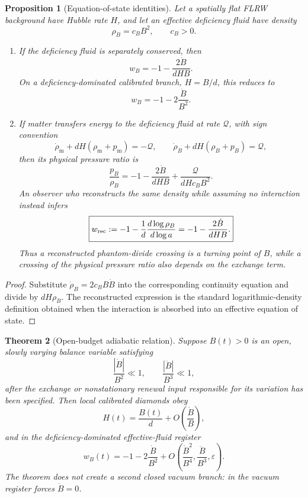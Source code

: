 \documentclass[11pt]{article}
\newtheorem{theorem}{Theorem}[section]
\newtheorem{proposition}[theorem]{Proposition}
\theoremstyle{definition}
\theoremstyle{remark}
\newcommand{\eps}{\varepsilon}
\begin{document}
\begin{proposition}[Equation-of-state identities]
\label{prop:deficiency-eos-identities}
Let a spatially flat FLRW background have Hubble rate \(H\), and let an effective
deficiency fluid have density
\[
  \rho_B=c_BB^2,
  \qquad c_B>0.
\]
\begin{enumerate}[label=\textup{(\roman*)},leftmargin=2.6em]
\item If the deficiency fluid is separately conserved, then
\[
  \boxed{
  w_B=-1-\frac{2\dot B}{dHB}.}
\]
On a deficiency-dominated calibrated branch, \(H=B/d\), this reduces to
\[
  \boxed{w_B=-1-2\frac{\dot B}{B^2}.}
\]
\item If matter transfers energy to the deficiency fluid at rate
\(\mathcal Q\), with sign convention
\[
 \dot\rho_{\mathrm{m}}+dH(\rho_{\mathrm{m}}+p_{\mathrm{m}})=-\mathcal Q,
 \qquad
 \dot\rho_B+dH(\rho_B+p_B)=\mathcal Q,
\]
then its physical pressure ratio is
\[
  \boxed{
  \frac{p_B}{\rho_B}
  =-1-\frac{2\dot B}{dHB}
    +\frac{\mathcal Q}{dHc_BB^2}.}
\]
An observer who reconstructs the same density while assuming no interaction
instead infers
\[
  \boxed{
  w_{\rm rec}:=-1-\frac1d\frac{d\log\rho_B}{d\log a}
  =-1-\frac{2\dot B}{dHB}.}
\]
Thus a reconstructed phantom-divide crossing is a turning point of \(B\), while
a crossing of the physical pressure ratio also depends on the exchange term.
\end{enumerate}
\end{proposition}

\begin{proof}
Substitute \(\dot\rho_B=2c_BB\dot B\) into the corresponding continuity
equation and divide by \(dH\rho_B\).  The reconstructed expression is the
standard logarithmic-density definition obtained when the interaction is
absorbed into an effective equation of state.
\end{proof}

\begin{theorem}[Open-budget adiabatic relation]
\label{thm:adiabatic-dark-energy}
Suppose \(B(t)>0\) is an open, slowly varying balance variable satisfying
\[
  \frac{|\dot B|}{B^2}\ll1,
  \qquad
  \frac{|\ddot B|}{B^3}\ll1,
\]
after the exchange or nonstationary renewal input responsible for its variation
has been specified.  Then local calibrated diamonds obey
\[
  H(t)=\frac{B(t)}{d}+O\!\left(\frac{\dot B}{B}\right),
\]
and in the deficiency-dominated effective-fluid register
\[
 \boxed{
 w_B(t)=-1-2\frac{\dot B}{B^2}
 +O\!\left(
 \frac{\dot B^2}{B^4},
 \frac{\ddot B}{B^3},
 \eps\right).}
\]
The theorem does not create a second closed vacuum branch: in the vacuum
register  forces
\(\dot B=0\).
\end{theorem}
\end{document}
